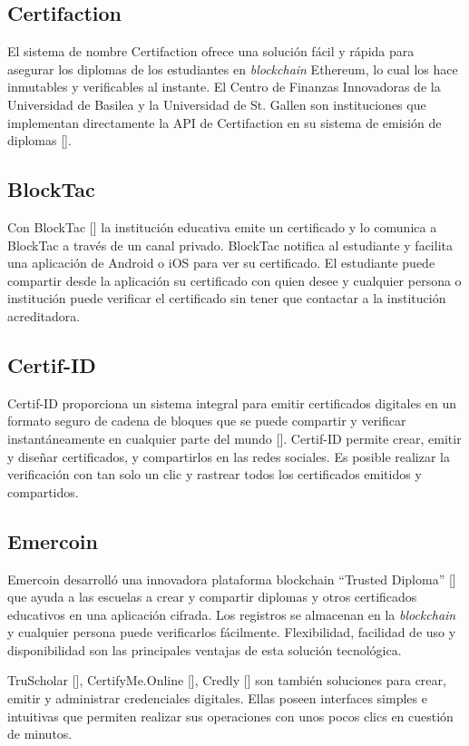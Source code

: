 \subsection{Certifaction}
El sistema de nombre Certifaction ofrece una solución fácil y rápida para asegurar los diplomas de los estudiantes en \textit{blockchain} Ethereum, lo cual los hace inmutables y verificables al instante. El Centro de Finanzas Innovadoras de la Universidad de Basilea y la Universidad de St. Gallen son instituciones que implementan directamente la API de Certifaction en su sistema de emisión de diplomas [\cite{82}].

\subsection{BlockTac}
Con BlockTac [\cite{83}] la institución educativa emite un certificado y lo comunica a BlockTac a través de un canal privado. BlockTac notifica al estudiante y facilita una aplicación de Android o iOS para ver su certificado. El estudiante puede compartir desde la aplicación su certificado con quien desee y cualquier persona o institución puede verificar el certificado sin tener que contactar a la institución acreditadora.

\subsection{Certif-ID}
Certif-ID proporciona un sistema integral para emitir certificados digitales en un formato seguro de cadena de bloques que se puede compartir y verificar instantáneamente en cualquier parte del mundo [\cite{84}]. Certif-ID permite crear, emitir y diseñar certificados, y compartirlos en las redes sociales. Es posible realizar la verificación con tan solo un clic y  rastrear todos los certificados emitidos y compartidos.

\subsection{Emercoin}
Emercoin desarrolló una innovadora plataforma blockchain ``Trusted Diploma'' [\cite{87}] que ayuda a las escuelas a crear y compartir diplomas y otros certificados educativos en una aplicación cifrada. Los registros se almacenan en la \textit{blockchain} y cualquier persona puede verificarlos fácilmente. Flexibilidad, facilidad de uso y disponibilidad son las principales ventajas de esta solución tecnológica.

TruScholar [\cite{86}], CertifyMe.Online [\cite{85}], Credly [\cite{89}] son también soluciones para crear, emitir y administrar credenciales digitales. Ellas poseen interfaces simples e intuitivas que permiten realizar sus operaciones con unos pocos clics en cuestión de minutos.

